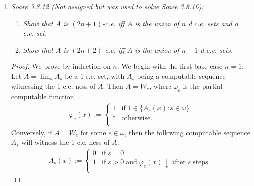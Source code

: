 \documentclass{article}
\begin{document}
\begin{enumerate}[label={\bf Q\arabic*:}]
\begin{enumerate}[label={(\roman*)}]
\begin{proof}
          So since $\beta$ is countable from (ii), and a countable union of
          countable objects is still countable,
          $\cup_{\alpha<\beta}[D^\alpha(T)]$ is also countable.
        \end{proof}
    \end{enumerate}

  \item \label{q:ce} \it Soare 3.8.12 (Not assigned but was used to solve
    Soare 3.8.16):
    \begin{enumerate}[label={(\roman*)}]
      \item \it Show that $A$ is $(2n+1)$-c.e. iff $A$ is the union of $n$
        d.c.e. sets and a c.e. set.
      \item \it Show that $A$ is $(2n+2)$-c.e. iff $A$ is the union of $n+1$
        d.c.e. sets.
    \end{enumerate}

    \begin{proof}
      We prove by induction on $n$. We begin with the first base case
      $n=1$. Let $A=\lim_s A_s$ be a 1-c.e. set, with $A_s$ being a
      computable sequence witnessing the 1-c.e.-ness of $A$. Then $A=W_e$,
      where $\varphi_e$ is the partial computable function
      \begin{align*}
        \varphi_e(x) :=
        \begin{cases}
          1 &\text{if}\; 1\in\{A_s(x):s\in\omega\}\\
          \uparrow &\text{otherwise}.\\
        \end{cases}
      \end{align*}
      Conversely, if $A=W_e$ for some $e\in\omega$, then the following
      computable sequence $A_s$ will witness the 1-c.e.-ness of $A$:
      \begin{align*}
        A_s(x) :=
        \begin{cases}
          0 &\text{if}\; s=0\\
          1 &\text{if}\; s>0\; \text{and}\; \varphi_e(x)\downarrow\;
          \text{after}\; s\; \text{steps}.\\
        \end{cases}
      \end{align*}


\end{proof}
\end{enumerate}
\end{document}
